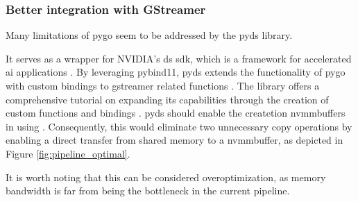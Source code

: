 \subsubsection{Better integration with GStreamer}
Many limitations of \gls{pygo} seem to be addressed by the \gls{pyds} library.

It serves as a wrapper for NVIDIA's \gls{ds} \gls{sdk}, which is a framework for accelerated \gls{ai} applications \cite{nvidiaDeepStreamSDK2016}.
By leveraging \gls{pybind11}, \gls{pyds} extends the functionality of \gls{pygo} with custom bindings to \gls{gstreamer} related functions \cite{nvidiaaiiotReleasesNVIDIAAIIOTDeepstream}.
The library offers a comprehensive tutorial on expanding its capabilities through the creation of custom functions and bindings \cite[\textit{bindings/BINDINGSGUIDE.md}]{nvidiaaiiotReleasesNVIDIAAIIOTDeepstream}.
\gls{pyds} should enable the createtion \glspl{nvmmbuffer} in \py using  \cite{nvidiaNvBufSurfaceCreateDeepstreamDeepstream2023}\cite{babukrCreatingGstBuffersUsing2021}.
Consequently, this would eliminate two unnecessary copy operations by enabling a direct transfer from shared memory to a \gls{nvmmbuffer}, as depicted in Figure \ref{fig:pipeline_optimal}.

It is worth noting that this can be considered overoptimization, as memory bandwidth is far from being the bottleneck in the current pipeline.
